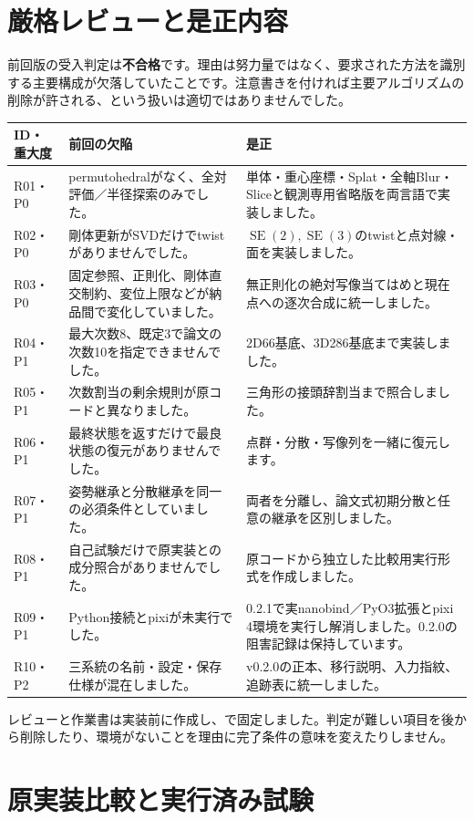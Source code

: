 \documentclass[a4paper,11pt]{article}
\newcommand{\SE}{\operatorname{SE}}
\numberwithin{equation}{section}
\begin{document}
\section{厳格レビューと是正内容}\label{sec:review}
前回版の受入判定は\textbf{不合格}です。理由は努力量ではなく、要求された方法を識別する主要構成が欠落していたことです。注意書きを付ければ主要アルゴリズムの削除が許される、という扱いは適切ではありませんでした。

\begin{longtable}{@{}p{19mm}p{65mm}p{69mm}@{}}
\toprule
ID・重大度 & 前回の欠陥 & 是正\\\midrule\endhead
R01・P0 & permutohedralがなく、全対評価／半径探索のみでした。 & 単体・重心座標・Splat・全軸Blur・Sliceと観測専用省略版を両言語で実装しました。\\
R02・P0 & 剛体更新がSVDだけでtwistがありませんでした。 & \(\SE(2),\SE(3)\)のtwistと点対線・面を実装しました。\\
R03・P0 & 固定参照、正則化、剛体直交制約、変位上限などが納品間で変化していました。 & 無正則化の絶対写像当てはめと現在点への逐次合成に統一しました。\\
R04・P1 & 最大次数8、既定3で論文の次数10を指定できませんでした。 & 2D66基底、3D286基底まで実装しました。\\
R05・P1 & 次数割当の剰余規則が原コードと異なりました。 & 三角形の接頭辞割当まで照合しました。\\
R06・P1 & 最終状態を返すだけで最良状態の復元がありませんでした。 & 点群・分散・写像列を一緒に復元します。\\
R07・P1 & 姿勢継承と分散継承を同一の必須条件としていました。 & 両者を分離し、論文式初期分散と任意の継承を区別しました。\\
R08・P1 & 自己試験だけで原実装との成分照合がありませんでした。 & 原コードから独立した比較用実行形式を作成しました。\\
R09・P1 & Python接続とpixiが未実行でした。 & 0.2.1で実nanobind／PyO3拡張とpixi 4環境を実行し解消しました。0.2.0の阻害記録は保持しています。\\
R10・P2 & 三系統の名前・設定・保存仕様が混在しました。 & v0.2.0の正本、移行説明、入力指紋、追跡表に統一しました。\\
\bottomrule
\end{longtable}

レビューと作業書は実装前に作成し、で固定しました。判定が難しい項目を後から削除したり、環境がないことを理由に完了条件の意味を変えたりしません。

\section{原実装比較と実行済み試験}\label{sec:tests}
\end{document}
